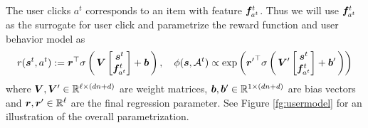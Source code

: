 \documentclass{article} %
\newcommand{\Li}[1]{{\color{cyan}{\bf\sf [Li: #1]}}}
\begin{document}
The user clicks $a^t$ corresponds to an item with feature ${\bm{f}}_{a^t}^t$. Thus we will use ${\bm{f}}_{a^t}^t$ as the surrogate for user click and parametrize the reward function and user behavior model as 
{\small \begin{equation}
    r({\bm{s}}^t, a^t) := {\bm{r}}^\top \sigma \left(\, {\bm{V}} \left[
    \begin{matrix}
        {\bm{s}}^t \cr
        {\bm{f}}_{a^t}^t
    \end{matrix}
    \right] + {\bm{b}} \, \right),~~~
    \phi({\bm{s}},{\mathcal{A}}^t) \propto \exp\left( 
    {{\bm{r}}'}^{\top} \sigma \left(\, {\bm{V}}' \left[
    \begin{matrix}
        {\bm{s}}^t \cr
        {\bm{f}}_{a^t}^t
    \end{matrix}
    \right] + {\bm{b}}' \, \right)    
    \right)     
\end{equation}}
where ${\bm{V}},{\bm{V}}' \in {\mathbb{R}}^{\ell \times (dn+d)}$ are weight matrices, ${\bm{b}},{\bm{b}}' \in {\mathbb{R}}^{ 1 \times (dn+d)}$ are bias vectors and ${\bm{r}},{\bm{r}}' \in {\mathbb{R}}^{\ell}$ are the final regression parameter. See Figure \ref{fg:usermodel} for an illustration of the overall parametrization. \Li{It seems that $\vr'$ here is used as the parameters of neural network, which is easy to cause misunderstanding with the reward function $r$ despite they are two different notations.}
\end{document}
